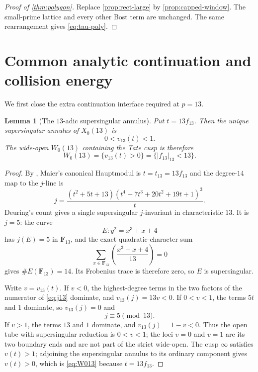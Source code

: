 \documentclass[11pt]{article}
\newtheorem{lemma}[lemma]{Lemma}
\theoremstyle{definition}
\theoremstyle{remark}
\newcommand{\F}{\mathbf F}
\begin{document}
\begin{proof}[Proof of \cref{thm:polygon}]
Replace \cref{prop:rect-large} by \cref{prop:capped-window}.  The small-prime
lattice and every other Bost term are unchanged.  The same rearrangement gives
\eqref{eq:tau-poly}.
\end{proof}

\section{Common analytic continuation and collision energy}\label{sec:analytic}

We first close the extra continuation interface required at $p=13$.

\begin{lemma}[The $13$-adic supersingular annulus]\label{lem:p13-annulus}
Put $t=13f_{13}$.  Then the unique supersingular annulus of $X_0(13)$ is
\[
 0<v_{13}(t)<1.
\]
The wide-open $W_0(13)$ containing the Tate cusp is therefore
\begin{equation}\label{eq:W013}
 W_0(13)=\{v_{13}(t)>0\}=\{|f_{13}|_{13}<13\}.
\end{equation}
\end{lemma}

\begin{proof}
By \cite[(3.2) and Table~4]{Maier2009}, Maier's canonical Hauptmodul is
$t=t_{13}=13f_{13}$ and the degree-$14$ map to the $j$-line is
\begin{equation}\label{eq:j13}
 j=\frac{(t^2+5t+13)
 (t^4+7t^3+20t^2+19t+1)^3}{t}.
\end{equation}
Deuring's count \cite{Deuring1941} gives a single supersingular
$j$-invariant in characteristic $13$.  It is $j=5$: the curve
\[
 E:y^2=x^3+x+4
\]
has $j(E)=5$ in $\F_{13}$, and the exact quadratic-character sum
\[
 \sum_{x\in\F_{13}}\left(\frac{x^3+x+4}{13}\right)=0
\]
gives $\#E(\F_{13})=14$.  Its Frobenius trace is therefore zero, so $E$ is
supersingular.

Write $v=v_{13}(t)$.  If $v<0$, the highest-degree terms in the two factors
of the numerator of \eqref{eq:j13} dominate, and
$v_{13}(j)=13v<0$.  If $0<v<1$, the terms $5t$ and $1$ dominate, so
$v_{13}(j)=0$ and
\[
 j\equiv5\pmod{13}.
\]
If $v>1$, the terms $13$ and $1$ dominate, and
$v_{13}(j)=1-v<0$.  Thus the open tube with supersingular reduction is
$0<v<1$; the loci $v=0$ and $v=1$ are its two boundary ends and are not part
of the strict wide-open.  The cusp $\infty$ satisfies $v(t)>1$; adjoining the
supersingular annulus to its ordinary component gives $v(t)>0$, which is
\eqref{eq:W013} because $t=13f_{13}$.
\end{proof}
\end{document}
